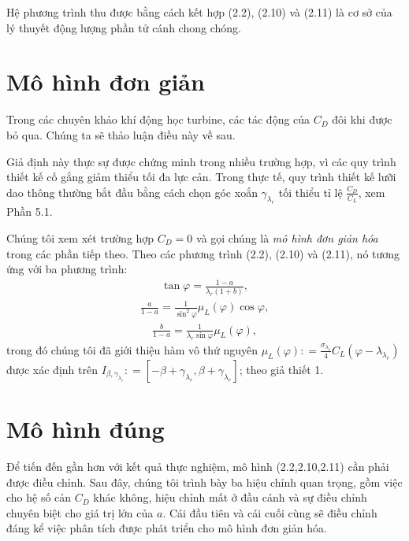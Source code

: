 \documentclass[a4paper,twoside,13pt]{extbook}
\begin{document}
Hệ phương trình thu được bằng cách kết hợp (2.2), (2.10) và (2.11) là cơ sở của lý thuyết động lượng phần tử cánh chong chóng.
\section{Mô hình đơn giản}
Trong các chuyên khảo khí động học turbine, các tác động của $C_D$ đôi khi được bỏ qua. Chúng ta sẽ thảo luận điều này về sau.

Giả định này thực sự được chứng minh trong nhiều trường hợp, vì các quy trình thiết kế cố gắng giảm thiểu tối đa lực cản. Trong thực tế, quy trình thiết kế lưỡi dao thông thường bắt đầu bằng cách chọn góc xoắn $\gamma_{\lambda_r}$ tối thiểu tỉ lệ $\displaystyle\frac{C_D}{C_L}$, xem Phần 5.1.

Chúng tôi xem xét trường hợp $C_D = 0$ và gọi chúng là \emph{mô hình đơn giản hóa} trong các phần tiếp theo. Theo các phương trình (2.2), (2.10) và (2.11), nó tương ứng với ba phương trình:
\begin{equation}\label{eq:1_13}
    \begin{aligned}
        \tan \varphi  = \frac{{1 - a}}{{{\lambda _r}\left( {1 + b} \right)}},
    \end{aligned}
\end{equation}
\begin{equation}\label{eq:1_14}
    \begin{aligned}
        \frac{a}{{1 - a}} = \frac{1}{{{{\sin }^2}\varphi }}{\mu _L}\left( \varphi  \right)\cos \varphi ,
    \end{aligned}
\end{equation}
\begin{equation}\label{eq:1_15}
    \begin{aligned}
        \frac{b}{{1 - a}} = \frac{1}{{{\lambda _r}\sin \varphi }}{\mu _L}\left( \varphi  \right),
    \end{aligned}
\end{equation}
trong đó chúng tôi đã giới thiệu hàm vô thứ nguyên $\displaystyle{\mu _L}\left( \varphi  \right): = \frac{{{\sigma _{{\lambda _r}}}}}{4}{C_L}\left( {\varphi  - {\lambda _{{\lambda _r}}}} \right)$ được xác định trên ${I_{\beta ,{\gamma _{{\lambda _r}}}}}: = \left[ { - \beta  + {\gamma _{{\lambda _r}}},\beta  + {\gamma _{{\lambda _r}}}} \right]$; theo giả thiết 1.
\section{Mô hình đúng}
Để tiến đến gần hơn với kết quả thực nghiệm, mô hình (2.2,2.10,2.11) cần phải được điều chỉnh. Sau đây, chúng tôi trình bày ba hiệu chỉnh quan trọng, gồm việc cho hệ số cản $C_D$ khác không, hiệu chỉnh mất ở đầu cánh và sự điều chỉnh chuyên biệt cho giá trị lớn của $a$. Cái đầu tiên và cái cuối cùng sẽ điều chỉnh đáng kể việc phân tích được phát triển cho mô hình đơn giản hóa.
\end{document}

